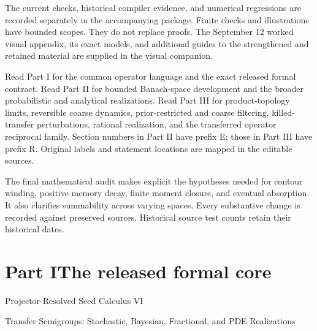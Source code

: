 \documentclass[11pt,a4paper]{article}
\theoremstyle{definition}
\theoremstyle{remark}
\begin{document}
The current checks, historical compiler evidence, and numerical regressions are recorded separately in the accompanying package. Finite checks and illustrations have bounded scopes. They do not replace proofs. The September 12 worked visual appendix, its exact models, and additional guides to the strengthened and retained material are supplied in the visual companion.

Read Part I for the common operator language and the exact released formal contract. Read Part II for bounded Banach-space development and the broader probabilistic and analytical realizations. Read Part III for product-topology limits, reversible coarse dynamics, prior-restricted and coarse filtering, killed-transfer perturbations, rational realization, and the transferred operator reciprocal family. Section numbers in Part II have prefix E; those in Part III have prefix R. Original labels and statement locations are mapped in the editable sources.

The final mathematical audit makes explicit the hypotheses needed for contour winding, positive memory decay, finite moment closure, and eventual absorption. It also clarifies summability across varying spaces. Every substantive change is recorded against preserved sources. Historical source test counts retain their historical dates.
\clearpage
\tableofcontents
\clearpage
\listoffigures
\listoftables
\clearpage
\part*{Part I\quad The released formal core}
\begin{center}\large Projector-Resolved Seed Calculus VI\par\normalsize Transfer Semigroups: Stochastic, Bayesian, Fractional, and PDE Realizations\end{center}
\end{document}
